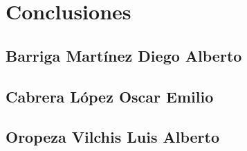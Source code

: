 \documentclass[12pt]{article}
\def\luis{Oropeza Vilchis Luis Alberto}
\def\diego{Barriga Mart\'inez Diego Alberto}
\def\emilio{Cabrera L\'opez Oscar Emilio}
\begin{document}
\section*{Conclusiones}

\subsection*{\diego}
\subsection*{\emilio}
\subsection*{\luis}
\end{document}
